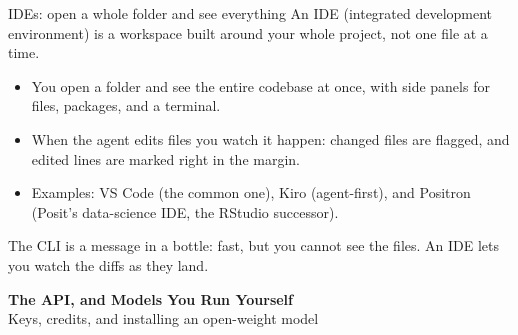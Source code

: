 \documentclass[aspectratio=169,11pt]{beamer}
\begin{document}
\begin{frame}{IDEs: open a whole folder and see everything}
An IDE (integrated development environment) is a workspace built around your whole project, not one file at a time.
\vspace{0.3cm}
\begin{itemize}\setlength\itemsep{0.25em}
    \item You open a folder and see the entire codebase at once, with side panels for files, packages, and a terminal.
    \item When the agent edits files you watch it happen: changed files are flagged, and edited lines are marked right in the margin.
    \item Examples: VS Code (the common one), Kiro (agent-first), and Positron (Posit's data-science IDE, the RStudio successor).
\end{itemize}
\vspace{0.3cm}
\alert{The CLI is a message in a bottle: fast, but you cannot see the files. An IDE lets you watch the diffs as they land.}
\end{frame}



\begin{frame}[plain]
\vfill
\begin{center}
{\LARGE\bfseries\textcolor{charcoal}{The API, and Models You Run Yourself}}\\[0.35cm]
{\large\textcolor{warmgray}{Keys, credits, and installing an open-weight model}}
\end{center}
\vfill
\end{frame}
\end{document}
